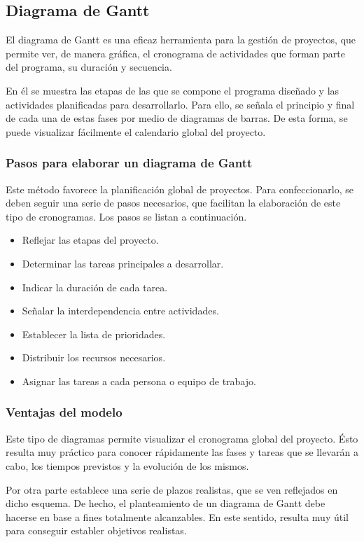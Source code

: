 \subsection{Diagrama de Gantt}
El diagrama de Gantt es una eficaz herramienta para la gestión de proyectos, que permite ver, de manera gráfica, el cronograma de actividades que forman parte del programa, su duración y secuencia.

En él se muestra las etapas de las que se compone el programa diseñado y las actividades planificadas para desarrollarlo. Para ello, se señala el principio y final de cada una de estas fases por medio de diagramas de barras. De esta forma, se puede visualizar  fácilmente  el calendario global del proyecto.

\subsubsection{Pasos para elaborar un diagrama de Gantt}
Este método favorece la planificación global de proyectos. Para confeccionarlo,  se deben seguir una serie de pasos necesarios, que facilitan la elaboración de este tipo de cronogramas. Los pasos se listan a continuación.

\begin{itemize}
	\item Reflejar las etapas del proyecto.
	\item Determinar las tareas principales a desarrollar.
	\item Indicar la duración de cada tarea.
	\item Señalar la interdependencia entre actividades.
	\item Establecer la lista de prioridades.
	\item Distribuir los recursos necesarios.
	\item Asignar las tareas a cada persona o equipo de trabajo.
\end{itemize}

\subsubsection{Ventajas del modelo}
Este tipo de diagramas permite visualizar el cronograma global del proyecto. 
Ésto resulta muy práctico para conocer rápidamente las fases y tareas que se llevarán a cabo, los tiempos previstos y la evolución de los mismos.

Por otra parte establece una serie de plazos realistas, que se ven reflejados en dicho esquema.
De hecho, el planteamiento de un diagrama de Gantt debe hacerse en base a fines totalmente alcanzables.
En este sentido, resulta muy útil para conseguir establer objetivos realistas.

